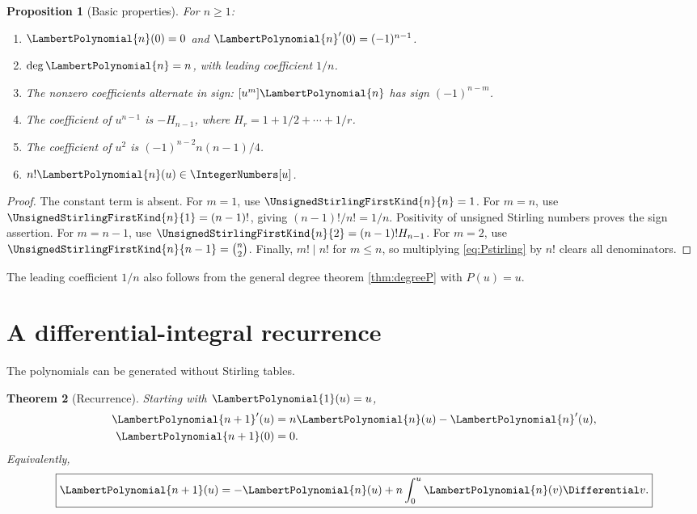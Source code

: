 \documentclass[11pt,oneside,openany]{book}
\newtheorem{theorem}{Theorem}[chapter]
\newtheorem{proposition}[theorem]{Proposition}
\begin{document}
\begin{proposition}[Basic properties]\label{prop:Pproperties}
For \(n\geq1\):
\begin{enumerate}
\item \(\LambertPolynomial{n}(0)=0\) and \(\LambertPolynomial{n}'(0)=(-1)^{n-1}\).
\item \(\deg \LambertPolynomial{n}=n\), with leading coefficient \(1/n\).
\item The nonzero coefficients alternate in sign:
\([u^m]\LambertPolynomial{n}\) has sign \((-1)^{n-m}\).
\item The coefficient of \(u^{n-1}\) is \(-H_{n-1}\), where
\(H_r=1+1/2+\cdots+1/r\).
\item The coefficient of \(u^2\) is
\((-1)^{n-2}n(n-1)/4\).
\item \(n!\LambertPolynomial{n}(u)\in\IntegerNumbers[u]\).
\end{enumerate}
\end{proposition}

\begin{proof}
The constant term is absent.  For \(m=1\), use
\(\UnsignedStirlingFirstKind{n}{n}=1\).  For \(m=n\), use
\(\UnsignedStirlingFirstKind{n}{1}=(n-1)!\), giving \((n-1)!/n!=1/n\).
Positivity of unsigned Stirling numbers proves the sign assertion.  For
\(m=n-1\), use
\(\UnsignedStirlingFirstKind{n}{2}=(n-1)!H_{n-1}\).  For \(m=2\), use
\(\UnsignedStirlingFirstKind{n}{n-1}=\binom n2\).  Finally, \(m!\mid n!\) for \(m\leq n\),
so multiplying \cref{eq:Pstirling} by \(n!\) clears all denominators.
\end{proof}

The leading coefficient \(1/n\) also follows from the general degree theorem
\cref{thm:degreeP} with \(P(u)=u\).

\section{A differential-integral recurrence}
The polynomials can be generated without Stirling tables.

\begin{theorem}[Recurrence]\label{thm:Precurrence}
Starting with \(\LambertPolynomial{1}(u)=u\),
\begin{align}
 \LambertPolynomial{n+1}'(u)&=n\LambertPolynomial{n}(u)-\LambertPolynomial{n}'(u),
 \label{eq:Pderivrec}\\
 \LambertPolynomial{n+1}(0)&=0.
 \label{eq:Pzero}
\end{align}
Equivalently,
\begin{equation}\label{eq:Pintegralrec}
 \boxed{
 \LambertPolynomial{n+1}(u)=-\LambertPolynomial{n}(u)+n\int_0^u\LambertPolynomial{n}(v)\Differential v.
 }
\end{equation}
\end{theorem}
\end{document}
